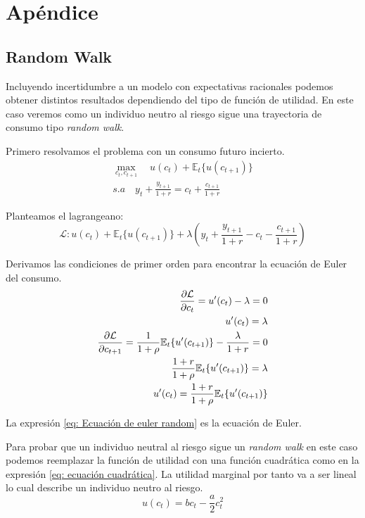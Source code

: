 \chapter{Apéndice}

\section{Random Walk}

Incluyendo incertidumbre a un modelo con expectativas racionales podemos obtener distintos resultados dependiendo del tipo de función de utilidad. En este caso veremos como un individuo neutro al riesgo sigue una trayectoria de consumo tipo \textit{random walk}.

Primero resolvamos el problema con un consumo futuro incierto.
\begin{align*}
    \max _{c_t , c_{t+1}} \quad  u(c_t)+ \mathbb{E}_t \{u(c_{t+1})\} \\ 
    s.a \quad y_t + \frac{y_{t+1}}{1+r} = c_t +\frac{c_{t+1}}{1+r}
\end{align*}

Planteamos el lagrangeano:
\begin{equation*}
    \mathcal{L}: u(c_t)+ \mathbb{E}_t \{ u(c_{t+1}) \} + \lambda \left(y_t + \frac{y_{t+1}}{1+r} - c_t - \frac{c_{t+1}}{1+r} \right)
\end{equation*}

Derivamos las condiciones de primer orden para encontrar la ecuación de Euler del consumo. 
\begin{align}
    \frac{\partial \mathcal{L}}{\partial c_t} =u'(c_t) -\lambda = 0    \notag \\   u'(c_t) = \lambda \\
    \frac{\partial \mathcal{L} }{\partial c_{t+1}} = \frac{1}{1+\rho} \mathbb{E}_t \{ u'(c_{t+1})\} - \frac{\lambda }{1+r} = 0 \notag 
 \\ \frac{1+r}{1+\rho } \mathbb{E}_t \{u'(c_{t+1})\} = \lambda \\
 u'(c_t) = \frac{1+r}{1+\rho} \mathbb{E}_t\{u'(c_{t+1})\} \label{eq: Ecuación de euler random}
\end{align}

La expresión \ref{eq: Ecuación de euler random} es la ecuación de Euler.

Para probar que un individuo neutral al riesgo sigue un \textit{random walk} en este caso podemos reemplazar la función de utilidad con una función cuadrática como en la expresión \ref{eq: ecuación cuadrática}. La utilidad marginal por tanto va a ser lineal lo cual describe un individuo neutro al riesgo.
\begin{equation}
    u(c_t) = bc_t - \frac{a}{2}c_t ^2 \label{eq: ecuación cuadrática}
\end{equation}

